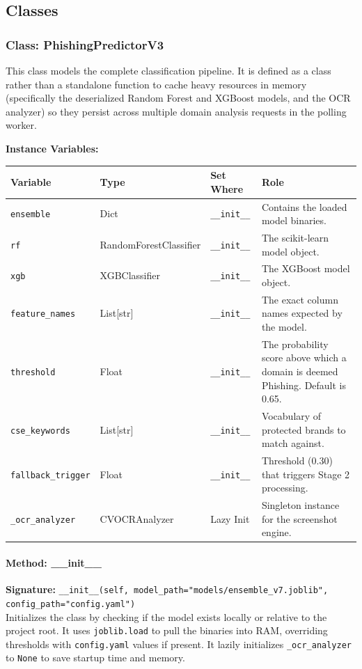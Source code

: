 \documentclass[12pt,a4paper]{report}
\begin{document}
\subsection{Classes}

\subsubsection{Class: PhishingPredictorV3}
This class models the complete classification pipeline. It is defined as a class rather than a standalone function to cache heavy resources in memory (specifically the deserialized Random Forest and XGBoost models, and the OCR analyzer) so they persist across multiple domain analysis requests in the polling worker.

\textbf{Instance Variables:}
\begin{longtable}{|p{3cm}|p{3cm}|p{3cm}|p{5cm}|}
\hline
\textbf{Variable} & \textbf{Type} & \textbf{Set Where} & \textbf{Role} \\
\hline
\endhead
\texttt{ensemble} & Dict & \texttt{\_\_init\_\_} & Contains the loaded model binaries. \\
\texttt{rf} & RandomForestClassifier & \texttt{\_\_init\_\_} & The scikit-learn model object. \\
\texttt{xgb} & XGBClassifier & \texttt{\_\_init\_\_} & The XGBoost model object. \\
\texttt{feature\_names} & List[str] & \texttt{\_\_init\_\_} & The exact column names expected by the model. \\
\texttt{threshold} & Float & \texttt{\_\_init\_\_} & The probability score above which a domain is deemed Phishing. Default is 0.65. \\
\texttt{cse\_keywords} & List[str] & \texttt{\_\_init\_\_} & Vocabulary of protected brands to match against. \\
\texttt{fallback\_trigger} & Float & \texttt{\_\_init\_\_} & Threshold (0.30) that triggers Stage 2 processing. \\
\texttt{\_ocr\_analyzer} & CVOCRAnalyzer & Lazy Init & Singleton instance for the screenshot engine. \\
\hline
\end{longtable}

\paragraph{Method: \_\_init\_\_}
\textbf{Signature:} \texttt{\_\_init\_\_(self, model\_path="models/ensemble\_v7.joblib", config\_path="config.yaml")} \\
Initializes the class by checking if the model exists locally or relative to the project root. It uses \texttt{joblib.load} to pull the binaries into RAM, overriding thresholds with \texttt{config.yaml} values if present. It lazily initializes \texttt{\_ocr\_analyzer} to \texttt{None} to save startup time and memory.
\end{document}
